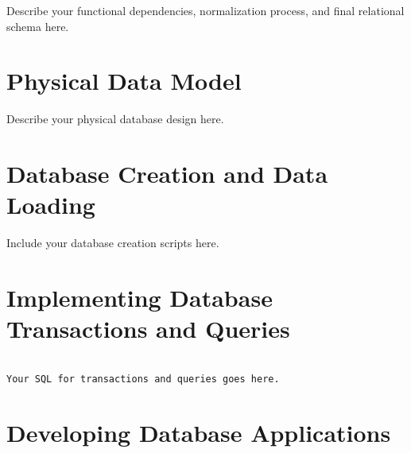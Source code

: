 \documentclass[11pt]{article}
\begin{document}
Describe your functional dependencies, normalization process, and final relational schema here.




\section{Physical Data Model} \label{sec:physical}


Describe your physical database design here.




\section{Database Creation and Data Loading} \label{sec:ddl}


Include your database creation scripts here.




\section{Implementing Database Transactions and Queries} \label{sec:implementation-1}



\begin{verbatim}

Your SQL for transactions and queries goes here.

\end{verbatim}




\section{Developing Database Applications} \label{sec:implementation-2}
\end{document}
